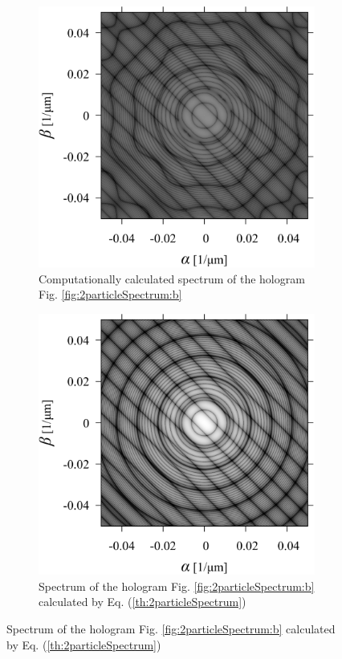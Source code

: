 \begin{figure}[htbp]
    \begin{subfigure}[b]{0.45\linewidth}
        \includegraphics[width=\linewidth]{./Figure/2_Theory/spectrum_example/c.pdf}
        \caption{Computationally calculated spectrum of the hologram Fig. \ref{fig:2particleSpectrum:b}}
        \label{fig:2particleSpectrum:c}
    \end{subfigure}
    \hfill
    \begin{subfigure}[b]{0.45\linewidth}
        \includegraphics[width=\linewidth]{./Figure/2_Theory/spectrum_example/d.pdf}
        \caption{Spectrum of the hologram Fig. \ref{fig:2particleSpectrum:b} calculated by Eq. (\ref{th:2particleSpectrum})}
        \label{fig:2particleSpectrum:d}
    \end{subfigure}


\end{figure}
